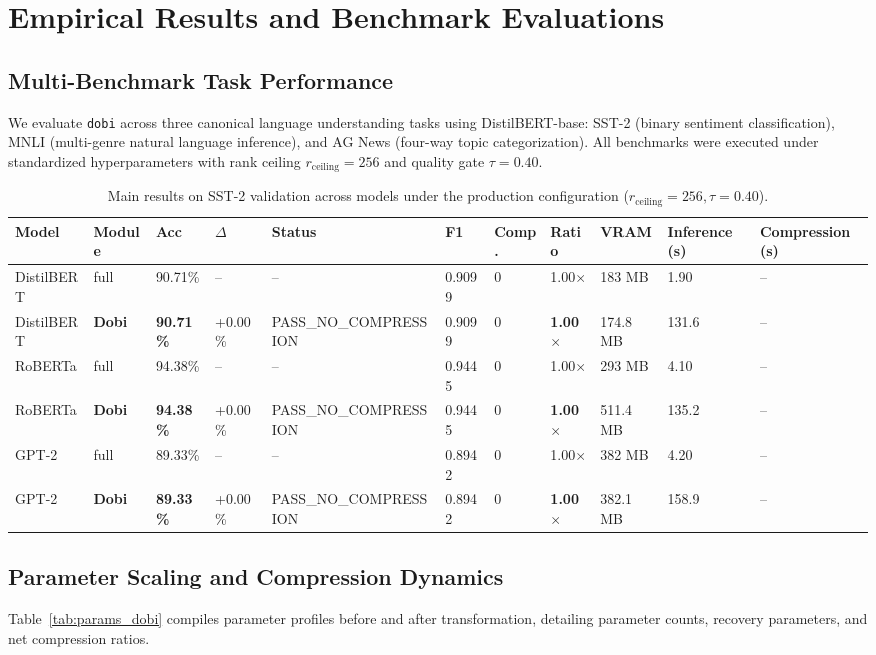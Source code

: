 \section{Empirical Results and Benchmark Evaluations}
\label{sec:results}

\subsection{Multi-Benchmark Task Performance}
We evaluate \texttt{dobi} across three canonical language understanding tasks using DistilBERT-base: SST-2 (binary sentiment classification), MNLI (multi-genre natural language inference), and AG News (four-way topic categorization). All benchmarks were executed under standardized hyperparameters with rank ceiling $r_{\mathrm{ceiling}} = 256$ and quality gate $\tau = 0.40$.

\begin{table}[t]
\centering
\small
\begin{tabular}{lllllllllll}
\toprule
\textbf{Model} & \textbf{Module} & \textbf{Acc} & \textbf{$\Delta$} & \textbf{Status} & \textbf{F1} & \textbf{Comp.} & \textbf{Ratio} & \textbf{VRAM} & \textbf{Inference (s)} & \textbf{Compression (s)} \\
\midrule
DistilBERT & full & 90.71\% & -- & -- & 0.9099 & 0 & 1.00$\times$ & 183 MB & 1.90 & -- \\
DistilBERT & \textbf{Dobi} & \textbf{90.71\%} & +0.00\% & PASS_NO_COMPRESSION & 0.9099 & 0 & \textbf{1.00$\times$} & 174.8 MB & 131.6 & -- \\
RoBERTa & full & 94.38\% & -- & -- & 0.9445 & 0 & 1.00$\times$ & 293 MB & 4.10 & -- \\
RoBERTa & \textbf{Dobi} & \textbf{94.38\%} & +0.00\% & PASS_NO_COMPRESSION & 0.9445 & 0 & \textbf{1.00$\times$} & 511.4 MB & 135.2 & -- \\
GPT-2 & full & 89.33\% & -- & -- & 0.8942 & 0 & 1.00$\times$ & 382 MB & 4.20 & -- \\
GPT-2 & \textbf{Dobi} & \textbf{89.33\%} & +0.00\% & PASS_NO_COMPRESSION & 0.8942 & 0 & \textbf{1.00$\times$} & 382.1 MB & 158.9 & -- \\
\bottomrule
\end{tabular}
\caption{Main results on SST-2 validation across models under the production configuration ($r_{\mathrm{ceiling}}=256, \tau=0.40$).}
\label{tab:main_sst2}
\end{table}

\subsection{Parameter Scaling and Compression Dynamics}
Table~\ref{tab:params_dobi} compiles parameter profiles before and after transformation, detailing parameter counts, recovery parameters, and net compression ratios.

